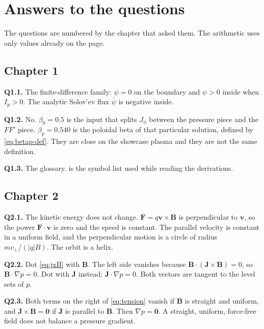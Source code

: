\documentclass[11pt,a4paper,oneside,openany]{book}
\numberwithin{equation}{chapter}
\newcommand{\psibar}{\bar{\psi}}
\newcommand{\grad}{\nabla}
\newcommand{\Ip}{I_{p}}
\theoremstyle{definition}
\begin{document}
\appendix
\makeatletter
\@mainmattertrue
\makeatother

\chapter{Answers to the questions}
\label{ch:answers}

The questions are numbered by the chapter that asked them. The arithmetic uses only values already on the page.

\section*{Chapter 1}

\textbf{Q1.1.} The finite-difference family: \(\psi=0\) on the boundary and \(\psi>0\) inside when \(\Ip>0\). The analytic Solov'ev flux \(\psibar\) is negative inside.

\textbf{Q1.2.} No. \(\beta_{0}=0.5\) is the input that splits \(J_{\phi}\) between the pressure piece and the \(FF'\) piece. \(\beta_{p}=0.540\) is the poloidal beta of that particular solution, defined by \eqref{eq:betap-def}. They are close on the showcase plasma and they are not the same definition.

\textbf{Q1.3.} The glossary.  is the symbol list used while reading the derivations.

\section*{Chapter 2}

\textbf{Q2.1.} The kinetic energy does not change. \(\mathbf{F}=q\mathbf{v}\times\mathbf{B}\) is perpendicular to \(\mathbf{v}\), so the power \(\mathbf{F}\cdot\mathbf{v}\) is zero and the speed is constant. The parallel velocity is constant in a uniform field, and the perpendicular motion is a circle of radius \(m v_{\perp}/(\lvert q\rvert B)\). The orbit is a helix.

\textbf{Q2.2.} Dot \eqref{eq:jxB} with \(\mathbf{B}\). The left side vanishes because \(\mathbf{B}\cdot(\mathbf{J}\times\mathbf{B})=0\), so \(\mathbf{B}\cdot\grad p=0\). Dot with \(\mathbf{J}\) instead: \(\mathbf{J}\cdot\grad p=0\). Both vectors are tangent to the level sets of \(p\).

\textbf{Q2.3.} Both terms on the right of \eqref{eq:tension} vanish if \(\mathbf{B}\) is straight and uniform, and \(\mathbf{J}\times\mathbf{B}=\mathbf{0}\) if \(\mathbf{J}\) is parallel to \(\mathbf{B}\). Then \(\grad p=\mathbf{0}\). A straight, uniform, force-free field does not balance a pressure gradient.
\end{document}
